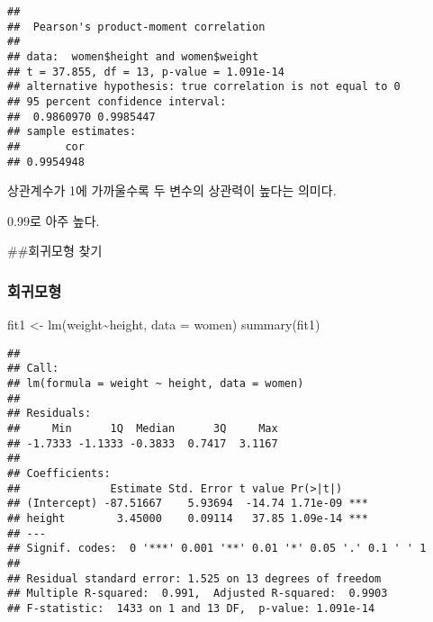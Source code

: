 \documentclass[
]{article}
\newenvironment{Shaded}{\begin{snugshade}}{\end{snugshade}}
\newcommand{\AttributeTok}[1]{\textcolor[rgb]{0.77,0.63,0.00}{#1}}
\newcommand{\FunctionTok}[1]{\textcolor[rgb]{0.00,0.00,0.00}{#1}}
\newcommand{\NormalTok}[1]{#1}
\newcommand{\OtherTok}[1]{\textcolor[rgb]{0.56,0.35,0.01}{#1}}
\newcommand{\SpecialCharTok}[1]{\textcolor[rgb]{0.00,0.00,0.00}{#1}}
\begin{document}
\begin{Shaded}
\end{Shaded}

\begin{verbatim}
## 
##  Pearson's product-moment correlation
## 
## data:  women$height and women$weight
## t = 37.855, df = 13, p-value = 1.091e-14
## alternative hypothesis: true correlation is not equal to 0
## 95 percent confidence interval:
##  0.9860970 0.9985447
## sample estimates:
##       cor 
## 0.9954948
\end{verbatim}

상관계수가 1에 가까울수록 두 변수의 상관력이 높다는 의미다.

0.99로 아주 높다.

\#\#회귀모형 찾기

\hypertarget{uxd68cuxadc0uxbaa8uxd615}{%
\subsubsection{회귀모형}\label{uxd68cuxadc0uxbaa8uxd615}}

\begin{Shaded}
\begin{Highlighting}[]
\NormalTok{fit1 }\OtherTok{\textless{}{-}} \FunctionTok{lm}\NormalTok{(weight}\SpecialCharTok{\textasciitilde{}}\NormalTok{height, }\AttributeTok{data =}\NormalTok{ women)}
\FunctionTok{summary}\NormalTok{(fit1)}
\end{Highlighting}
\end{Shaded}

\begin{verbatim}
## 
## Call:
## lm(formula = weight ~ height, data = women)
## 
## Residuals:
##     Min      1Q  Median      3Q     Max 
## -1.7333 -1.1333 -0.3833  0.7417  3.1167 
## 
## Coefficients:
##              Estimate Std. Error t value Pr(>|t|)    
## (Intercept) -87.51667    5.93694  -14.74 1.71e-09 ***
## height        3.45000    0.09114   37.85 1.09e-14 ***
## ---
## Signif. codes:  0 '***' 0.001 '**' 0.01 '*' 0.05 '.' 0.1 ' ' 1
## 
## Residual standard error: 1.525 on 13 degrees of freedom
## Multiple R-squared:  0.991,  Adjusted R-squared:  0.9903 
## F-statistic:  1433 on 1 and 13 DF,  p-value: 1.091e-14
\end{verbatim}
\end{document}
